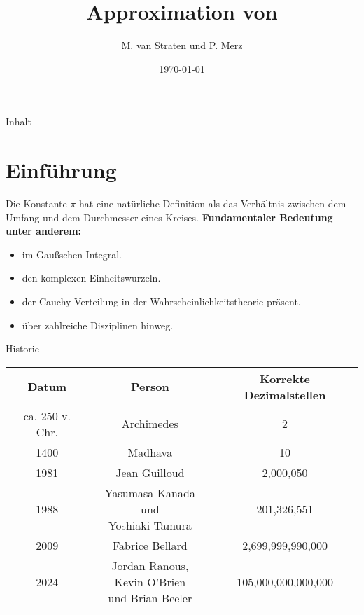 \documentclass[9pt, t]{beamer}
\title{Approximation von \textpi}
\author{M. van Straten und P. Merz}
\institute{Humboldt-Universität zu Berlin \\
           Sommersemester 2024}
\date{\today}
\begin{document}
\maketitle

\begin{frame}{Inhalt}
    \tableofcontents[pausesections]
\end{frame}

\section{Einführung}

\begin{frame}
    Die Konstante \(\pi\) hat eine natürliche Definition als das Verhältnis
    zwischen dem Umfang und dem Durchmesser eines Kreises.
    \newline\newline
    \textbf{Fundamentaler Bedeutung unter anderem:}
    \begin{itemize}[<+(1)->]
        \item im Gaußschen Integral.
        \item den komplexen Einheitswurzeln.
        \item der Cauchy-Verteilung in der Wahrscheinlichkeitstheorie präsent.
        \item über zahlreiche Disziplinen hinweg.
    \end{itemize}
\end{frame}

\begin{frame}{Historie \cite{Chronology}}
    \begin{tabular}{|c||c||c|}
        \hline
        Datum & Person                          & Korrekte Dezimalstellen \\
        \hline
        ca. 250 v.
        Chr.
              & Archimedes                      & 2                       \\
        \hline
        1400  & Madhava                         & 10                      \\
        \hline
        1981  & Jean Guilloud                   & 2,000,050               \\
        \hline
        1988  & \shortstack{Yasumasa Kanada und                           \\ Yoshiaki Tamura} & 201,326,551\\
        \hline
        2009  & Fabrice Bellard                 & 2,699,999,990,000       \\
        \hline
        2024  & \shortstack{Jordan Ranous,                                \\
        Kevin O’Brien                                                     \\ und Brian Beeler} & 105,000,000,000,000\\
        \hline
    \end{tabular}
\end{frame}
\end{document}
